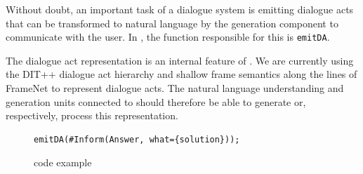 
Without doubt, an important task of a dialogue system is emitting dialogue acts that can be transformed to natural language by the generation component to communicate with the user. In \vonda, the function responsible for this is \texttt{emitDA}.

The dialogue act representation is an internal feature of \vonda. We are currently using the DIT++ dialogue act hierarchy \citep{bunt2012iso} and shallow frame semantics along the lines of FrameNet \citep{ruppenhofer2016framenet} to represent dialogue acts. The natural language understanding and generation units connected to \vonda should therefore be able to generate or, respectively, process this representation.

\begin{figure}[htb]
  \centering\small%
\begin{lstlisting}
emitDA(#Inform(Answer, what={solution}));
\end{lstlisting}\vspace*{-3ex}
  \caption{\vonda code example}
  \label{fig:DA}
\end{figure}



